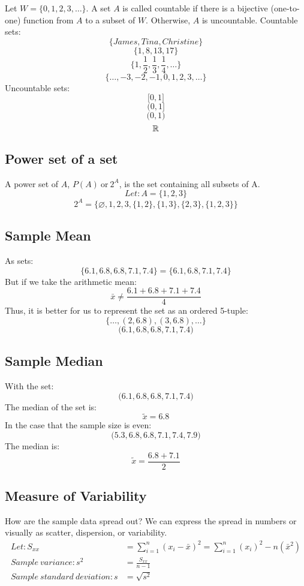 \documentclass[letterpaper, 12pt]{math}
\begin{document}
Let \( W = \big\{ 0, 1, 2, 3, \dots \big\} \). A set \( A \) is called
countable if there is a bijective (one-to-one) function from \( A \) to a
subset of \( W \). Otherwise, \( A \) is uncountable.
Countable sets:
\[ \bigg\{ James, Tina, Christine \bigg\} \]
\[ \bigg\{ 1, 8, 13, 17 \bigg\} \]
\[ \bigg\{ 1, \frac{1}{2}, \frac{1}{3}, \frac{1}{4}, \dots \bigg\} \]
\[ \bigg\{ \dots, -3, -2, -1, 0, 1, 2, 3, \dots \bigg\} \]
Uncountable sets:
\[ \bigg[ 0, 1 \bigg] \]
\[ \bigg( 0, 1 \bigg] \]
\[ \bigg( 0, 1 \bigg) \]
\[ \mathbb{R} \]

\subsection*{Power set of a set}
A power set of \( A \), \( P(A) \mathrm{\ or\ } 2^{A} \), is the set containing
all subsets of A.
\[ Let: A = \bigg\{ 1, 2, 3 \bigg\} \]
\[ 2^{A} = \bigg\{ \varnothing, 1, 2, 3, \{1, 2\}, \{1, 3\}, \{2, 3\},
   \{1, 2, 3\} \bigg\} \]

\subsection*{Sample Mean}
As sets:
\[ \bigg\{ 6.1, 6.8, 6.8, 7.1, 7.4 \bigg\} =
   \bigg\{ 6.1, 6.8, 7.1, 7.4 \bigg\} \]
But if we take the arithmetic mean:
\[ \bar{x} \neq \frac{6.1+6.8+7.1+7.4}{4} \]
Thus, it is better for us to represent the set as an ordered 5-tuple:
\[ \bigg\{ \dots, (2,6.8), (3,6.8), \dots \bigg \} \]
\[ \bigg( 6.1, 6.8, 6.8, 7.1, 7.4 \bigg) \]

\subsection*{Sample Median}
With the set:
\[ \bigg( 6.1, 6.8, 6.8, 7.1, 7.4 \bigg) \]
The median of the set is:
\[ \tilde{x} = 6.8 \]
In the case that the sample size is even:
\[ \bigg( 5.3, 6.8, 6.8, 7.1, 7.4, 7.9 \bigg) \]
The median is:
\[ \tilde{x} = \frac{6.8+7.1}{2} \]

\subsection*{Measure of Variability}
How are the sample data spread out? We can express the spread in numbers
or visually as scatter, dispersion, or variability.
\begin{align*}
  Let: S_{xx} &= \sum_{i=1}^{n}(x_{i}-\bar{x})^{2} =
    \sum_{i=1}^{n}(x_{i})^{2}-n(\bar{x}^{2}) \\
  Sample\ variance: s^{2} &= \frac{S_{xx}}{n-1} \\
  Sample\ standard\ deviation: s &= \sqrt{s^{2}}
\end{align*}
\end{document}
